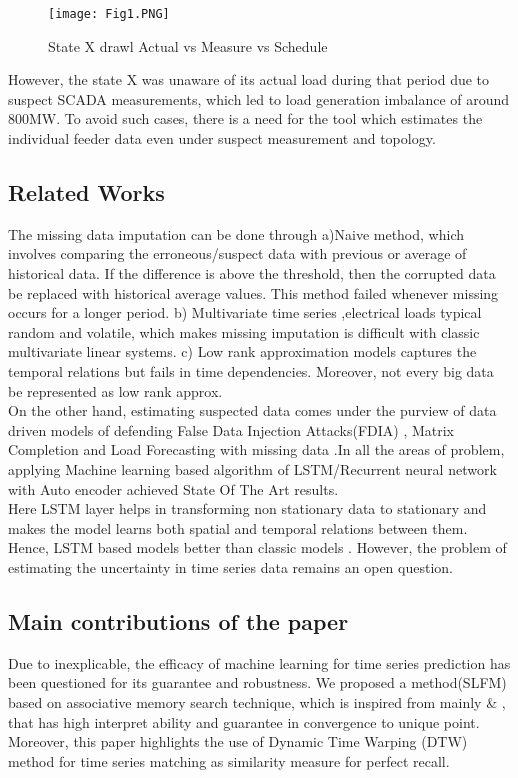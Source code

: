 \documentclass[conference]{IEEEtran}
\begin{document}
\begin{figure}
\texttt{[image: Fig1.PNG]}
\caption{State X drawl Actual vs Measure vs Schedule}
\end{figure}
However, the state X was unaware of its actual load during that period due to suspect SCADA measurements, which led to load generation imbalance of around 800MW. To avoid such cases, there is a need for the tool which estimates the individual feeder data even under suspect measurement and topology.
\subsection{Related Works}
The missing data imputation can be done through a)Naive method, which involves comparing the erroneous/suspect data with previous or average of historical data. If the difference is above the threshold, then the corrupted data be replaced with historical average values. This method failed whenever missing occurs for a longer period. b) Multivariate time series \cite {b7} \cite{b8} \cite{b13},electrical loads typical random and volatile, which makes missing imputation is difficult with classic multivariate linear systems. c) Low rank approximation \cite{b16} models captures the temporal relations but fails in time dependencies. Moreover, not every big data be represented as low rank approx.\\

On the other hand, estimating suspected data comes under the purview of data driven models of defending False Data Injection Attacks(FDIA) \cite{b2} , Matrix Completion \cite{b3} and Load Forecasting with missing data\cite{b4} \cite{b9}.In all the areas of problem, applying Machine learning based algorithm of LSTM/Recurrent neural network with Auto encoder achieved State Of The Art results. \\

Here LSTM layer helps in transforming non stationary data to stationary and makes the model learns both spatial and temporal relations between them. Hence, LSTM based models better than classic models \cite{b6}. However, the problem of estimating the uncertainty in time series data remains an open question.\\

\subsection{Main contributions of the paper}
Due to inexplicable, the efficacy of machine learning for time series prediction has been questioned for its guarantee and robustness. We proposed a  method(SLFM) based on associative memory search technique, which is inspired from mainly \cite{b11} \& \cite{b12}, that has high interpret ability and guarantee in convergence to unique point. Moreover, this paper highlights the use of Dynamic  Time Warping (DTW) method for time series matching as similarity measure for perfect recall.\\
\end{document}
